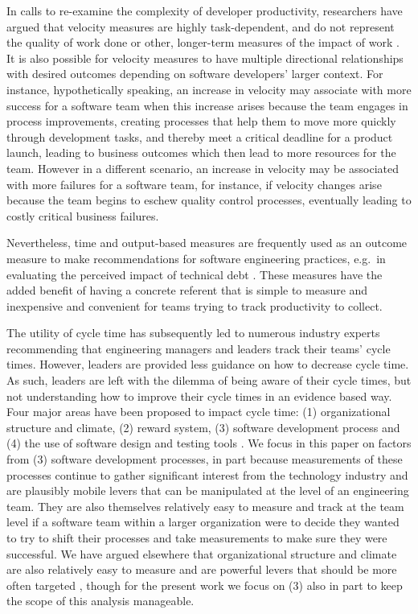 \documentclass[manuscript,screen,review]{acmart}
\begin{document}
In calls to re-examine the complexity of developer productivity,
researchers have argued that velocity measures are highly
task-dependent, and do not represent the quality of work done or other,
longer-term measures of the impact of work
\citep{sadowskiSoftwareDevelopmentProductivity2019}. It is also possible
for velocity measures to have multiple directional relationships with
desired outcomes depending on software developers' larger context. For
instance, hypothetically speaking, an increase in velocity may associate
with more success for a software team when this increase arises because
the team engages in process improvements, creating processes that help
them to move more quickly through development tasks, and thereby meet a
critical deadline for a product launch, leading to business outcomes
which then lead to more resources for the team. However in a different
scenario, an increase in velocity may be associated with more failures
for a software team, for instance, if velocity changes arise because the
team begins to eschew quality control processes, eventually leading to
costly critical business failures.

Nevertheless, time and output-based measures are frequently used as an
outcome measure to make recommendations for software engineering
practices, e.g.~in evaluating the perceived impact of technical debt
\citep{beskerTechnicalDebtCripples2018}. These measures have the added
benefit of having a concrete referent that is simple to measure and
inexpensive and convenient for teams trying to track productivity to
collect.

The utility of cycle time has subsequently led to numerous industry
experts recommending that engineering managers and leaders track their
teams' cycle times. However, leaders are provided less guidance on how
to decrease cycle time. As such, leaders are left with the dilemma of
being aware of their cycle times, but not understanding how to improve
their cycle times in an evidence based way. Four major areas have been
proposed to impact cycle time: (1) organizational structure and climate,
(2) reward system, (3) software development process and (4) the use of
software design and testing tools
\citep{clincySoftwareDevelopmentProductivity2003}. We focus in this
paper on factors from (3) software development processes, in part
because measurements of these processes continue to gather significant
interest from the technology industry and are plausibly mobile levers
that can be manipulated at the level of an engineering team. They are
also themselves relatively easy to measure and track at the team level
if a software team within a larger organization were to decide they
wanted to try to shift their processes and take measurements to make
sure they were successful. We have argued elsewhere that organizational
structure and climate are also relatively easy to measure and are
powerful levers that should be more often targeted
\citep{hicksCumulativeCultureTheory2024, hicksDeveloperThrivingFour2023, hicksDeveloperThrivingFour2024},
though for the present work we focus on (3) also in part to keep the
scope of this analysis manageable.
\end{document}
